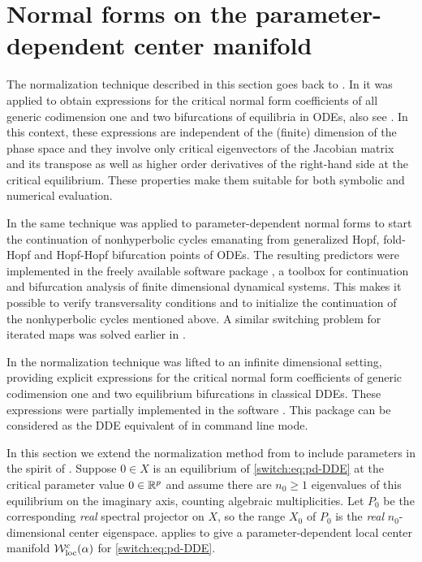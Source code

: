\section{\phantom{ }Normal forms on the parameter-dependent center \phantom{ }manifold\label{switch:sec:normal-forms}}
The normalization technique described in this section goes back to \cite{Coullet1983competinginstabilities}. In \cite{Kuznetsov1999} it was applied to obtain expressions for the critical normal form coefficients of all generic codimension one and two bifurcations of equilibria in ODEs, also see \cite[\S 8.7]{Kuznetsov2004}. In this context, these expressions are independent of the (finite) dimension of the phase space and they involve only critical eigenvectors of the Jacobian matrix and its transpose as well as higher order derivatives of the right-hand side at the critical equilibrium. These properties make them suitable for both symbolic and numerical evaluation.
\par
In \cite{Kuznetsov2008} the same technique was applied to parameter-dependent normal forms to start the continuation of nonhyperbolic cycles emanating from generalized Hopf, fold-Hopf and Hopf-Hopf bifurcation points of ODEs. The resulting predictors were implemented in the freely available software package \MATCONT \cite{matcont1}, a \MATLAB toolbox for continuation and bifurcation analysis of finite dimensional dynamical systems. This makes it possible to verify transversality conditions and to initialize the continuation of the nonhyperbolic cycles mentioned above. A similar switching problem for iterated maps was solved earlier in \cite{Govaerts2007maps}.
\par
In \cite{Janssens:Thesis} the normalization technique was lifted to an infinite dimensional setting, providing explicit expressions for the critical normal form coefficients of generic codimension one and two equilibrium bifurcations in classical DDEs. These expressions were partially implemented in the software \DDEBIFTOOL. This package can be considered as the DDE equivalent of \MATCONT in command line mode.
\par
In this section we extend the normalization method from \cite{Janssens:Thesis} to include parameters in the spirit of \cite{Kuznetsov2008}. Suppose $0 \in X$ is an equilibrium of \cref{switch:eq:pd-DDE} at the critical parameter value $0 \in \mathbb{R}^p$ and assume there are $n_0 \ge 1$ eigenvalues of this equilibrium on the imaginary axis, counting algebraic multiplicities. Let $P_0$ be the corresponding \emph{real} spectral projector on $X$, so the range $X_0$ of $P_0$ is the \emph{real} $n_0$-dimensional center eigenspace.  applies to give a parameter-dependent local center manifold $\mathcal{W}^c_{\text{loc}}(\alpha)$ for \cref{switch:eq:pd-DDE}.
